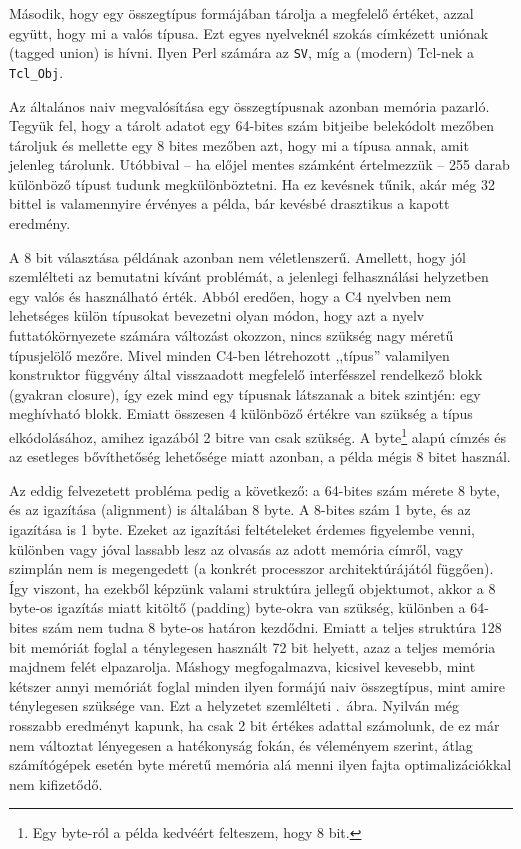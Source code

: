 Második, hogy egy összegtípus formájában tárolja a megfelelő értéket, azzal együtt, hogy mi a valós típusa.
Ezt egyes nyelveknél szokás címkézett uniónak (tagged union) is
hívni.
Ilyen Perl számára az {\tt SV}, míg a (modern) Tcl-nek a {\tt Tcl\_Obj}.

Az általános naiv megvalósítása egy összegtípusnak azonban memória pazarló.
Tegyük fel, hogy a tárolt adatot egy 64-bites szám bitjeibe belekódolt mezőben tároljuk és mellette egy 8 bites mezőben azt, hogy mi a típusa annak, amit jelenleg tárolunk.
Utóbbival -- ha előjel mentes számként értelmezzük -- 255 darab különböző típust tudunk megkülönböztetni.
Ha ez kevésnek tűnik, akár még 32 bittel is valamennyire érvényes a példa, bár kevésbé drasztikus a kapott eredmény.

A 8 bit választása példának azonban nem véletlenszerű.
Amellett, hogy jól szemlélteti az bemutatni kívánt problémát, a jelenlegi felhasználási helyzetben egy valós és használható érték.
Abból eredően, hogy a C4 nyelvben nem lehetséges külön típusokat bevezetni olyan módon, hogy azt a nyelv futtatókörnyezete számára változást okozzon, nincs szükség nagy méretű típusjelölő mezőre.
Mivel minden C4-ben létrehozott ,,típus'' valamilyen konstruktor függvény által visszaadott megfelelő interfésszel rendelkező blokk (gyakran closure), így ezek mind egy típusnak látszanak a bitek szintjén: egy meghívható blokk.
Emiatt összesen 4 különböző értékre van szükség a típus elkódolásához, amihez igazából 2 bitre van csak szükség. 
A byte\footnote{Egy byte-ról a példa kedvéért felteszem, hogy 8 bit.} alapú címzés és az esetleges bővíthetőség lehetősége miatt azonban, a példa mégis 8 bitet használ.

Az eddig felvezetett probléma pedig a következő: a 64-bites szám mérete 8 byte, és az igazítása (alignment) is általában 8 byte.
A 8-bites szám 1 byte, és az igazítása is 1 byte.
Ezeket az igazítási feltételeket érdemes figyelembe venni, különben vagy jóval lassabb lesz az olvasás az adott memória címről, vagy szimplán nem is megengedett (a konkrét processzor architektúrájától függően).
Így viszont, ha ezekből képzünk valami struktúra jellegű objektumot, akkor a 8 byte-os igazítás miatt kitöltő (padding) byte-okra van szükség, különben a 64-bites szám nem tudna 8 byte-os határon kezdődni.
Emiatt a teljes struktúra 128 bit memóriát foglal a ténylegesen használt 72 bit helyett, azaz a teljes memória majdnem felét elpazarolja.
Máshogy megfogalmazva, kicsivel kevesebb, mint kétszer annyi memóriát foglal minden ilyen formájú naiv összegtípus, mint amire ténylegesen szüksége van.
Ezt a helyzetet szemlélteti .~ábra.
Nyilván még rosszabb eredményt kapunk, ha csak 2 bit értékes adattal számolunk, de ez már nem változtat lényegesen a hatékonyság fokán, és véleményem szerint, átlag számítógépek esetén byte méretű memória alá menni ilyen fajta optimalizációkkal nem kifizetődő.

